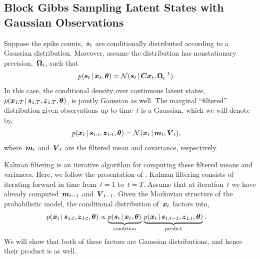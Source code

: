 \subsection{Block Gibbs Sampling Latent States with Gaussian Observations}
Suppose the spike counts,~$\boldsymbol{s}_t$ are conditionally distributed
according to a Gaussian distribution. Moreover, assume the
distribution has nonstationary precision,~$\boldsymbol{\Omega}_t$, such that
\begin{align}
  \label{eq:gauss_lkhd}
  p(\boldsymbol{s}_t \,|\, \boldsymbol{x}_t, \boldsymbol{\theta}) 
  &=
  \mathcal{N}(\boldsymbol{s}_t \,|\, \boldsymbol{C} \boldsymbol{x}_t, \boldsymbol{\Omega}_t^{-1}).
\end{align}
In this case, the conditional density over continuous latent
states,~${p(\boldsymbol{x}_{1:T} \,|\, \boldsymbol{s}_{1:T}, \boldsymbol{z}_{1:T}, \boldsymbol{\theta})}$, is
jointly Gaussian as well.  The marginal ``filtered'' distribution
given observations up to time~$t$ is a Gaussian, which we will denote
by,
\begin{align*}
  p(\boldsymbol{x}_t \,|\, \boldsymbol{s}_{1:t}, \boldsymbol{z}_{1:t}, \boldsymbol{\theta}) &= \mathcal{N}(\boldsymbol{x}_t \,|\, \boldsymbol{m}_t, \boldsymbol{V}_t),
\end{align*}
where~$\boldsymbol{m}_t$ and~$\boldsymbol{V}_t$ are the filtered mean and covariance, respectively.

Kalman filtering is an iterative algorithm for computing these filtered means 
and variances. 
Here, we follow the presentation of
\citet[Chapter 18]{murphy2012probabilistic}.  Kalman filtering consists
of iterating forward in time from~${t=1}$ to~${t=T}$. Assume that at iteration~$t$ we
have already computed~$\boldsymbol{m}_{t-1}$ and~$\boldsymbol{V}_{t-1}$. Given the
Markovian structure of the probabilistic model, the
conditional distribution of~$\boldsymbol{x}_t$ factors into,
\begin{align*}
  p(\boldsymbol{x}_t \,|\, \boldsymbol{s}_{1:t}, \boldsymbol{z}_{1:t}, \boldsymbol{\theta})
  &\propto
  \underbrace{p(\boldsymbol{s}_t \,|\, \boldsymbol{x}_t, \boldsymbol{\theta})}_{\text{condition}} \,
  \underbrace{p(\boldsymbol{x}_{t} \,|\, \boldsymbol{s}_{1:t-1}, \boldsymbol{z}_{1:t}, \boldsymbol{\theta})}_{\text{predict}}.
\end{align*}
We will show that both of these factors are Gaussian distributions, 
and hence their product is as well. 


